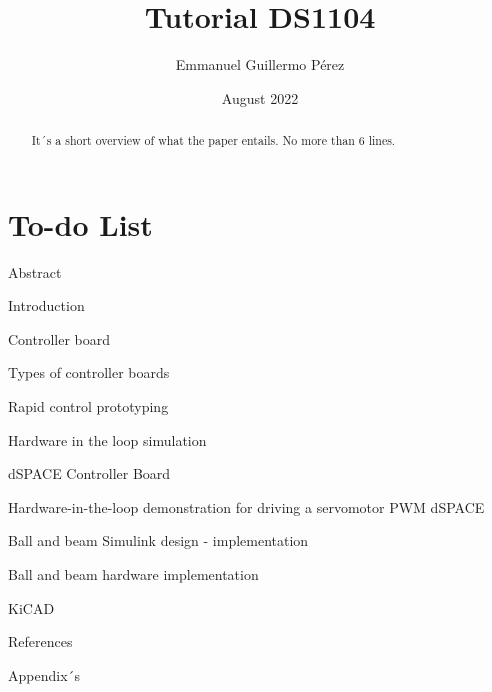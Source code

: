 

\title{Tutorial DS1104}
\author{Emmanuel Guillermo Pérez }
\date{August 2022}



\maketitle
\thispagestyle{empty}
\titlepage
\renewcommand*\contentsname{Summary}
\tableofcontents



\thispagestyle{empty}
\section*{To-do List}

\begin{todolist}%
    \item{Abstract}
    \item{Introduction}
    \item{Controller board}
    \begin{todolist}
        \item{Types of controller boards}
    \end{todolist} 
    \item[\done]{Rapid control prototyping}
    \item[\done]{Hardware in the loop simulation}
    \item{dSPACE Controller Board}
    \item[\done]{Hardware-in-the-loop demonstration for driving a servomotor PWM dSPACE}
    \item {Ball and beam Simulink design - implementation}
    \item {Ball and beam hardware implementation}
    \item {KiCAD}
    \item{References}
    \item{Appendix´s}
\end{todolist}
\newpage

\setcounter{page}{1}


\begin{abstract}
It´s a short overview of what the paper entails. No more than 6 lines.
\end{abstract}

